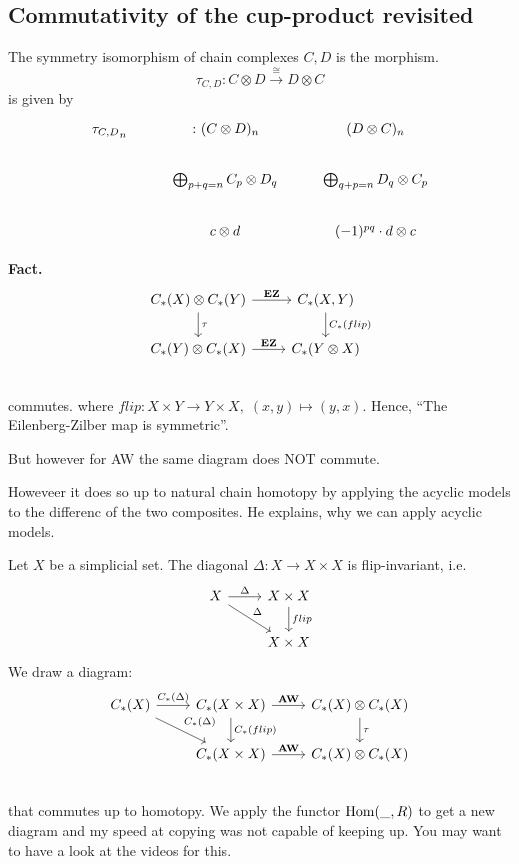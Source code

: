 \documentclass[language=english]{TemplateLecture}
\begin{document}
\subsection{Commutativity of the cup-product revisited}

The symmetry isomorphism of chain complexes \(C,D\) is the morphism.
\[\tau_{C,D} \colon C\otimes D \xrightarrow{\cong} D\otimes C\]
is given by
\[\begin{tikzcd}
    {\tau_{C,D}}_n & \colon (C\otimes D)_n & (D\otimes C)_n \\
    & \bigoplus_{p+q = n} C_p \otimes D_q & \bigoplus_{q+p= n} D_q \otimes C_p \\
    & c\otimes d & (-1)^{pq} \cdot d\otimes c
\end{tikzcd}\]

\textbf{Fact.}
\[\begin{tikzcd}
    C_*(X) \otimes C_*(Y) \ar[d, "\tau"] \ar[r, "\mathbf{EZ}"] & C_*(X,Y) \ar[d, "C_*(flip)"] \\
    C_*(Y) \otimes C_*(X) \ar[r, "\mathbf{EZ}"] & C_*(Y\otimes X) \\
\end{tikzcd}\]
commutes. where \(flip \colon X \times Y \to Y \times X, \; (x,y) \mapsto (y,x)\).
Hence, \enquote{The Eilenberg-Zilber map is symmetric}.

But however for AW the same diagram does NOT commute.


Howeveer it does so up to natural chain homotopy by applying the acyclic models to the differenc of the two composites. He explains, why we can apply acyclic models.

Let \(X\) be a simplicial set. The diagonal \(\Delta\colon X \to X \times X\) is flip-invariant, i.e.
\[\begin{tikzcd}
    X \ar[r, "\Delta"]\ar[rd, "\Delta"] & X\times X \ar[d, "flip"] \\
    & X \times X
\end{tikzcd}\]
We draw a diagram:
\[\begin{tikzcd}
    C_*(X) \ar[r, "C_*(\Delta)"] \ar[rd, "C_*(\Delta)"] & C_*(X\times X) \ar[d, "C_*(flip)"]\ar[r, "\mathbf{AW}"] &C_*(X) \otimes C_*(X) \ar[d, "\tau"]\\
    & C_*(X\times X) \ar[r, "\mathbf{AW}"]& C_*(X) \otimes C_*(X) \\
\end{tikzcd}\]
that commutes up to homotopy. We apply the functor \(\operatorname{Hom}(\_, R)\) to get a new diagram and my speed at copying was not capable of keeping up. You may want to have a look at the videos for this.
\end{document}
